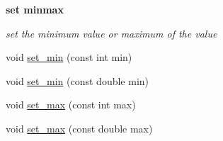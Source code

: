\begin{Indent}{\bf set minmax}\par
{\em set the minimum value or maximum of the value }\begin{DoxyCompactItemize}
\item 
void \hyperlink{classCapitalFunction_ae0d414289f9e6b97d408a3fd56818d62}{set\-\_\-min} (const int min)
\item 
void \hyperlink{classCapitalFunction_a90cc64dbc33810044903663f43b6281a}{set\-\_\-min} (const double min)
\item 
void \hyperlink{classCapitalFunction_a18968f5530879cbbeee6f0ed5b4e5b06}{set\-\_\-max} (const int max)
\item 
void \hyperlink{classCapitalFunction_ab30fe1096d179553407e1f393e2b3bb3}{set\-\_\-max} (const double max)
\end{DoxyCompactItemize}
\end{Indent}
